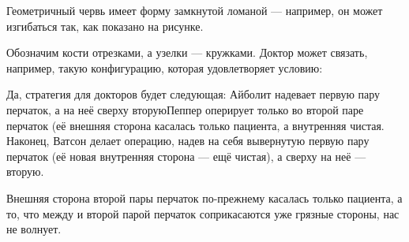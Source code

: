 \begin{itemize}

\itA Геометричный червь имеет форму замкнутой ломаной — например, он может изгибаться так, как показано на рисунке.

\begin{center}  \end{center}

\itB Обозначим кости отрезками, а узелки — кружками. Доктор может связать, например, такую конфигурацию, которая удовлетворяет условию:

\begin{center}  \end{center}

\itC Да, стратегия для докторов будет следующая: Айболит надевает первую пару перчаток, а на неё сверху вторую\scolon Пеппер оперирует только во второй паре перчаток (её внешняя сторона касалась только пациента, а внутренняя чистая. Наконец, Ватсон делает операцию, надев на себя вывернутую первую пару перчаток (её новая внутренняя сторона — ещё чистая), а сверху на неё — вторую.

Внешняя сторона второй пары перчаток по-прежнему касалась только пациента, а то, что между и второй парой перчаток соприкасаются уже грязные стороны, нас не волнует.
\end{itemize}